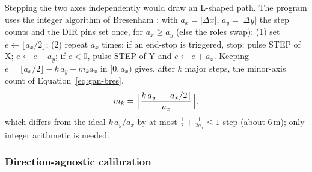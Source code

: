 Stepping the two axes independently would draw an L-shaped path.
The program uses the integer algorithm of Bresenham \cite{bresenham1965}: with $a_x=|\Delta x|$, $a_y=|\Delta y|$ the step counts and the DIR pins set once, for $a_x\ge a_y$ (else the roles swap): (1) set $e\leftarrow\lfloor a_x/2\rfloor$; (2) repeat $a_x$ times: if an end-stop is triggered, stop; pulse STEP of X; $e\leftarrow e-a_y$; if $e<0$, pulse STEP of Y and $e\leftarrow e+a_x$.
Keeping $e=\lfloor a_x/2\rfloor-k\,a_y+m_ka_x$ in $[0,a_x)$ gives, after $k$ major steps, the minor-axis count of Equation~\ref{eq:gan-bres},
\begin{equation}
m_k=\Bigl\lceil\frac{k\,a_y-\lfloor a_x/2\rfloor}{a_x}\Bigr\rceil,
\label{eq:gan-bres}
\end{equation}
which differs from the ideal $k\,a_y/a_x$ by at most $\tfrac12+\tfrac1{2a_x}\le1$ step (about 6\,\textmu m); only integer arithmetic is needed.

\subsubsection{Direction-agnostic calibration}
\label{sec:gan-calib}

